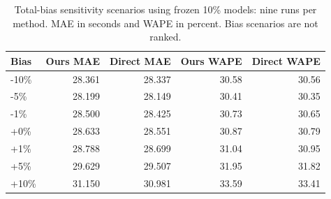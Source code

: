 \begin{table}[t]
\centering\footnotesize\setlength{\tabcolsep}{4pt}
\caption{Total-bias sensitivity scenarios using frozen 10\% models: nine runs per method. MAE in seconds and WAPE in percent. Bias scenarios are not ranked.}\label{tab:stress}
\begin{tabular}{lrrrr}\toprule
Bias & Ours MAE & Direct MAE & Ours WAPE & Direct WAPE\\\midrule
-10\% & 28.361 & 28.337 & 30.58 & 30.56\\
-5\% & 28.199 & 28.149 & 30.41 & 30.35\\
-1\% & 28.500 & 28.425 & 30.73 & 30.65\\
+0\% & 28.633 & 28.551 & 30.87 & 30.79\\
+1\% & 28.788 & 28.699 & 31.04 & 30.95\\
+5\% & 29.629 & 29.507 & 31.95 & 31.82\\
+10\% & 31.150 & 30.981 & 33.59 & 33.41\\
\bottomrule\end{tabular}
\end{table}
